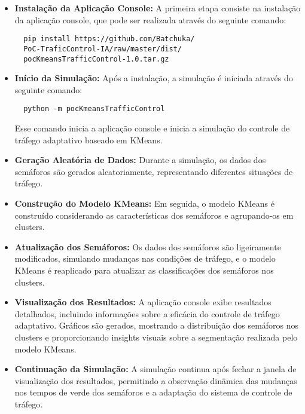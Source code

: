\documentclass[a4paper, 10pt, conference]{IEEEtran}
\begin{document}
\begin{itemize}
  \item \textbf{Instalação da Aplicação Console:}
  A primeira etapa consiste na instalação da aplicação console, que pode ser realizada através do seguinte comando:
  \begin{verbatim}
  pip install https://github.com/Batchuka/
  PoC-TraficControl-IA/raw/master/dist/
  pocKmeansTrafficControl-1.0.tar.gz
  \end{verbatim}

  \item \textbf{Início da Simulação:}
  Após a instalação, a simulação é iniciada através do seguinte comando:
  \begin{verbatim}
  python -m pocKmeansTrafficControl
  \end{verbatim}
  Esse comando inicia a aplicação console e inicia a simulação do controle de tráfego adaptativo baseado em KMeans.

  \item \textbf{Geração Aleatória de Dados:}
  Durante a simulação, os dados dos semáforos são gerados aleatoriamente, representando diferentes situações de tráfego.

  \item \textbf{Construção do Modelo KMeans:}
  Em seguida, o modelo KMeans é construído considerando as características dos semáforos e agrupando-os em clusters.

  \item \textbf{Atualização dos Semáforos:}
  Os dados dos semáforos são ligeiramente modificados, simulando mudanças nas condições de tráfego, e o modelo KMeans é reaplicado para atualizar as classificações dos semáforos nos clusters.

  \item \textbf{Visualização dos Resultados:}
  A aplicação console exibe resultados detalhados, incluindo informações sobre a eficácia do controle de tráfego adaptativo. Gráficos são gerados, mostrando a distribuição dos semáforos nos clusters e proporcionando insights visuais sobre a segmentação realizada pelo modelo KMeans.

  \item \textbf{Continuação da Simulação:}
  A simulação continua após fechar a janela de visualização dos resultados, permitindo a observação dinâmica das mudanças nos tempos de verde dos semáforos e a adaptação do sistema de controle de tráfego.
\end{itemize}
\end{document}
